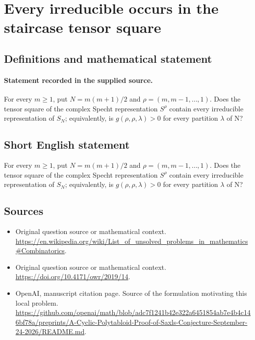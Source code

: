 \documentclass[11pt]{article}
\begin{document}
\section*{Every irreducible occurs in the staircase tensor square}\label{30007003}
\subsection{Definitions and mathematical statement}
\paragraph{Statement recorded in the supplied source.}
For every $m\geq 1$, put $N=m(m+1)/2$ and $\rho =(m,m-1,\dots ,1)$. Does the tensor square of the complex Specht representation $S^\rho $ contain every irreducible representation of $S_N$; equivalently, is $g(\rho ,\rho ,\lambda )>0$ for every partition $\lambda $ of N?
\subsection{Short English statement}
For every $m\geq 1$, put $N=m(m+1)/2$ and $\rho =(m,m-1,\dots ,1)$. Does the tensor square of the complex Specht representation $S^\rho $ contain every irreducible representation of $S_N$; equivalently, is $g(\rho ,\rho ,\lambda )>0$ for every partition $\lambda $ of N?
\subsection{Sources}
\begin{itemize}
\item[S1] Original question source or mathematical context.
\url{https://en.wikipedia.org/wiki/List_of_unsolved_problems_in_mathematics#Combinatorics}.
\item[S2] Original question source or mathematical context.
\url{https://doi.org/10.4171/owr/2019/14}.
\item[S3] OpenAI, manuscript citation page. Source of the formulation motivating this local problem.
\url{https://github.com/openai/math/blob/adc7f1241b42e322a6451854ab7e4b4c146bf78a/preprints/A-Cyclic-Polytabloid-Proof-of-Saxls-Conjecture-September-24-2026/README.md}.
\end{itemize}
\end{document}
